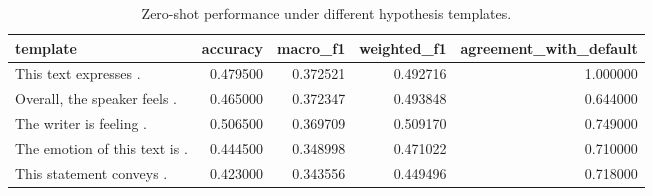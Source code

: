\begin{table}
\caption{Zero-shot performance under different hypothesis templates.}
\label{tab:zero-shot-template-sensitivity}
\begin{tabular}{lrrrr}
\toprule
template & accuracy & macro_f1 & weighted_f1 & agreement_with_default \\
\midrule
This text expresses {}. & 0.479500 & 0.372521 & 0.492716 & 1.000000 \\
Overall, the speaker feels {}. & 0.465000 & 0.372347 & 0.493848 & 0.644000 \\
The writer is feeling {}. & 0.506500 & 0.369709 & 0.509170 & 0.749000 \\
The emotion of this text is {}. & 0.444500 & 0.348998 & 0.471022 & 0.710000 \\
This statement conveys {}. & 0.423000 & 0.343556 & 0.449496 & 0.718000 \\
\bottomrule
\end{tabular}
\end{table}
